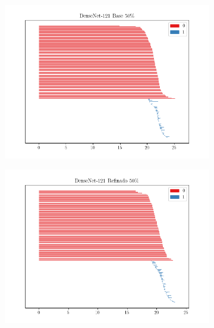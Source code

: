 \begin{figure}[H]
\begin{subfigure}
	\end{subfigure}
	\begin{subfigure}
		{.5\textwidth}
		\centering
		\includegraphics[width=\linewidth]{img/bar_densenet_base_0.50.png}
	\end{subfigure}%
	\begin{subfigure}
		{.5\textwidth}
		\centering
		\includegraphics[width=\linewidth]{img/bar_densenet_refine_0.50.png}
	\end{subfigure}
	\begin{subfigure}
		{.5\textwidth}
		\centering

\end{subfigure}
\end{figure}
